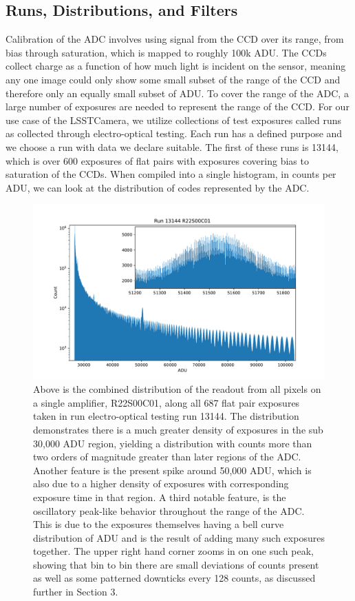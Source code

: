 \documentclass[11pt, letterpaper]{article}
\begin{document}
\subsection{Runs, Distributions, and Filters}
\label{sec: RDF}
\indent

Calibration of the ADC involves using signal from the CCD over its range, from bias through saturation, which is mapped to roughly 100k ADU. 
The CCDs collect charge as a function of how much light is incident on the sensor, meaning any one image could only show some small subset of the range of the CCD and therefore only an equally small subset of ADU.
To cover the range of the ADC, a large number of exposures are needed to represent the range of the CCD. 
For our use case of the LSSTCamera, we utilize collections of test exposures called runs as collected through electro-optical testing. 
Each run has a defined purpose and we choose a run with data we declare suitable. 
The first of these runs is 13144, which is over 600 exposures of flat pairs with exposures covering bias to saturation of the CCDs. 
When compiled into a single histogram, in counts per ADU, we can look at the distribution of codes represented by the ADC.  

\begin{figure}
    \centering
    \includegraphics[width=0.5\linewidth]{bar1.pdf}
    \caption{Above is the combined distribution of the readout from all pixels on a single amplifier, R22S00C01, along all 687 flat pair exposures taken in run electro-optical testing run 13144. The distribution demonstrates there is a much greater density of exposures in the sub 30,000 ADU region, yielding a distribution with counts more than two orders of magnitude greater than later regions of the ADC. Another feature is the present spike around 50,000 ADU, which is also due to a higher density of exposures with corresponding exposure time in that region. A third notable feature, is the oscillatory peak-like behavior throughout the range of the ADC. This is due to the exposures themselves having a bell curve distribution of ADU and is the result of adding many such exposures together. The upper right hand corner zooms in on one such peak, showing that bin to bin there are small deviations of counts present as well as some patterned downticks every 128 counts, as discussed further in Section 3.}
    \label{fig:unscaled13144}
\end{figure}
\end{document}
